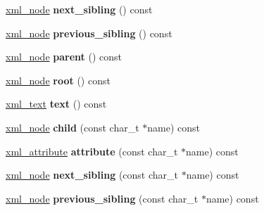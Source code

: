 \begin{DoxyCompactItemize}
\item 
\hypertarget{classpugi_1_1xml__node_a713159ab981fb3f0a325434106dc94f5}{\hyperlink{classpugi_1_1xml__node}{xml\-\_\-node} {\bfseries next\-\_\-sibling} () const }\label{classpugi_1_1xml__node_a713159ab981fb3f0a325434106dc94f5}

\item 
\hypertarget{classpugi_1_1xml__node_a367e7e2c78a3870aad7ad3831da7c0fa}{\hyperlink{classpugi_1_1xml__node}{xml\-\_\-node} {\bfseries previous\-\_\-sibling} () const }\label{classpugi_1_1xml__node_a367e7e2c78a3870aad7ad3831da7c0fa}

\item 
\hypertarget{classpugi_1_1xml__node_a5c7a1b2ec89d59afa1028e9c5fc25640}{\hyperlink{classpugi_1_1xml__node}{xml\-\_\-node} {\bfseries parent} () const }\label{classpugi_1_1xml__node_a5c7a1b2ec89d59afa1028e9c5fc25640}

\item 
\hypertarget{classpugi_1_1xml__node_a713b60fd5cddd5d8671dd76b1457e6eb}{\hyperlink{classpugi_1_1xml__node}{xml\-\_\-node} {\bfseries root} () const }\label{classpugi_1_1xml__node_a713b60fd5cddd5d8671dd76b1457e6eb}

\item 
\hypertarget{classpugi_1_1xml__node_aafe1c1c7cd27f3c9c758b517abc7886a}{\hyperlink{classpugi_1_1xml__text}{xml\-\_\-text} {\bfseries text} () const }\label{classpugi_1_1xml__node_aafe1c1c7cd27f3c9c758b517abc7886a}

\item 
\hypertarget{classpugi_1_1xml__node_af3aa192b114a289640110c9e4da020ca}{\hyperlink{classpugi_1_1xml__node}{xml\-\_\-node} {\bfseries child} (const char\-\_\-t $\ast$name) const }\label{classpugi_1_1xml__node_af3aa192b114a289640110c9e4da020ca}

\item 
\hypertarget{classpugi_1_1xml__node_a19fc1a285c0f751f52c0e151a727de97}{\hyperlink{classpugi_1_1xml__attribute}{xml\-\_\-attribute} {\bfseries attribute} (const char\-\_\-t $\ast$name) const }\label{classpugi_1_1xml__node_a19fc1a285c0f751f52c0e151a727de97}

\item 
\hypertarget{classpugi_1_1xml__node_a51a25d1e6f2315b65a1f969126cbc612}{\hyperlink{classpugi_1_1xml__node}{xml\-\_\-node} {\bfseries next\-\_\-sibling} (const char\-\_\-t $\ast$name) const }\label{classpugi_1_1xml__node_a51a25d1e6f2315b65a1f969126cbc612}

\item 
\hypertarget{classpugi_1_1xml__node_a311405d1ee4a564071a5f44b476b05f7}{\hyperlink{classpugi_1_1xml__node}{xml\-\_\-node} {\bfseries previous\-\_\-sibling} (const char\-\_\-t $\ast$name) const }\label{classpugi_1_1xml__node_a311405d1ee4a564071a5f44b476b05f7}


\end{DoxyCompactItemize}

